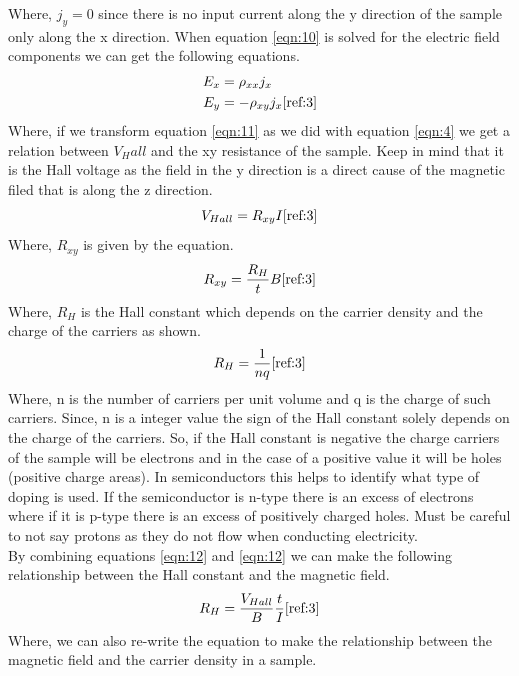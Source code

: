 \documentclass[twocolumn]{article}
\begin{document}
Where, $j_y = 0$ since there is no input current along the y direction of the 
sample only along the x direction. When equation \ref{eqn:10} is solved for the 
electric field components we can get the following equations.
\begin{equation}
\begin{align*}
E_x &= \rho_{xx}j_x\\
E_y &= -\rho_{xy}j_x
\cite{ref:3}
\label{eqn:11}
\end{align*}
\end{equation}
Where, if we transform equation \ref{eqn:11} as we did with equation 
\ref{eqn:4} we get a 
relation between $V_Hall$ and the xy resistance of the sample. Keep in mind 
that it is the Hall voltage as the field in the y direction is a direct cause 
of the magnetic filed that is along the z direction.
\begin{equation}
V_{Hall} = R_{xy}I
\cite{ref:3}
\label{eqn:12}
\end{equation}
Where, $R_{xy}$ is given by the equation.
\begin{equation}
R_{xy} = \frac{R_H}{t}B
\cite{ref:3}
\label{eqn:12}
\end{equation}
Where, $R_H$ is the Hall constant which depends on the carrier density and the 
charge of the carriers as shown.
\begin{equation}
R_{H} = \frac{1}{nq}
\cite{ref:3}
\label{eqn:13}
\end{equation}
Where, n is the number of carriers per unit volume and q is the charge of such 
carriers. Since, n is a integer value the sign of the Hall constant solely 
depends on the charge of the carriers. So, if the Hall constant is negative the 
charge carriers of the sample will be electrons and in the case of a positive 
value it will be holes (positive charge areas). In semiconductors this helps to 
identify what type of doping is used. If the semiconductor is n-type there is 
an excess of electrons where if it is p-type there is an excess of positively 
charged holes. Must be careful to not say protons as they do not flow when 
conducting electricity.
\\
By combining equations \ref{eqn:12} and \ref{eqn:12} we can make the following 
relationship between the Hall constant and the magnetic field.
\begin{equation}
R_{H} = \frac{V_{Hall}}{B}\frac{t}{I}
\cite{ref:3}
\label{eqn:14}
\end{equation}
Where, we can also re-write the equation to make the relationship between the 
magnetic field and the carrier density in a sample.
\end{document}
